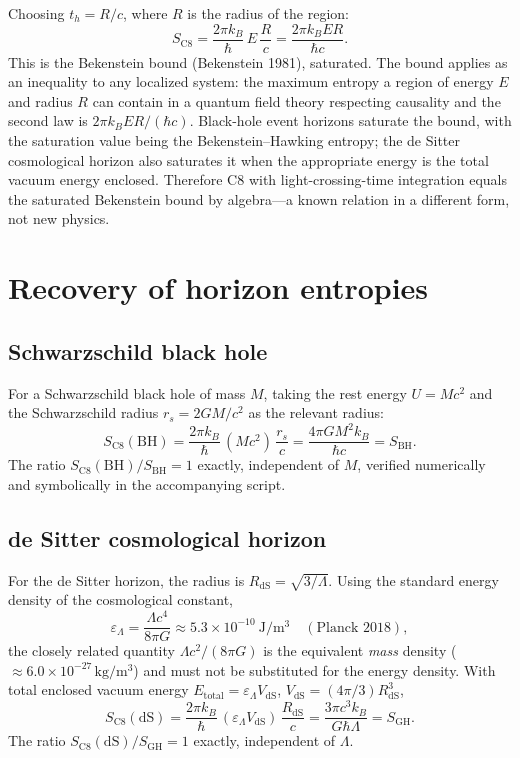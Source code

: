 \documentclass[11pt]{article}
\newcommand{\SC}{S_{\mathrm{C8}}}
\begin{document}
Choosing $t_{h} = R/c$, where $R$ is the radius of the region:
\begin{equation}
  \SC = \frac{2\pi k_{B}}{\hbar}\,E\,\frac{R}{c} = \frac{2\pi k_{B} E R}{\hbar c}.
\end{equation}
This is the Bekenstein bound (Bekenstein 1981), saturated. The bound applies as an inequality to any
localized system: the maximum entropy a region of energy $E$ and radius $R$ can contain in a quantum
field theory respecting causality and the second law is $2\pi k_{B} E R/(\hbar c)$. Black-hole event
horizons saturate the bound, with the saturation value being the Bekenstein--Hawking entropy; the de
Sitter cosmological horizon also saturates it when the appropriate energy is the total vacuum energy
enclosed. Therefore C8 with light-crossing-time integration equals the saturated Bekenstein bound by
algebra---a known relation in a different form, not new physics.

\section{Recovery of horizon entropies}
\subsection{Schwarzschild black hole}
For a Schwarzschild black hole of mass $M$, taking the rest energy $U = Mc^{2}$ and the Schwarzschild
radius $r_{s} = 2GM/c^{2}$ as the relevant radius:
\begin{equation}
  \SC(\mathrm{BH}) = \frac{2\pi k_{B}}{\hbar}\,(Mc^{2})\,\frac{r_{s}}{c}
  = \frac{4\pi G M^{2} k_{B}}{\hbar c} = S_{\mathrm{BH}}.
\end{equation}
The ratio $\SC(\mathrm{BH})/S_{\mathrm{BH}} = 1$ exactly, independent of $M$, verified numerically and
symbolically in the accompanying script.

\subsection{de Sitter cosmological horizon}
For the de Sitter horizon, the radius is $R_{\mathrm{dS}} = \sqrt{3/\Lambda}$. Using the standard
energy density of the cosmological constant,
\begin{equation}
  \varepsilon_{\Lambda} = \frac{\Lambda c^{4}}{8\pi G} \approx 5.3\times 10^{-10}\ \mathrm{J/m^{3}}
  \quad(\text{Planck 2018}),
\end{equation}
the closely related quantity $\Lambda c^{2}/(8\pi G)$ is the equivalent \emph{mass} density
($\approx 6.0\times 10^{-27}\,\mathrm{kg/m^{3}}$) and must not be substituted for the energy density.
With total enclosed vacuum energy $E_{\mathrm{total}} = \varepsilon_{\Lambda} V_{\mathrm{dS}}$,
$V_{\mathrm{dS}} = (4\pi/3)R_{\mathrm{dS}}^{3}$,
\begin{equation}
  \SC(\mathrm{dS}) = \frac{2\pi k_{B}}{\hbar}\,(\varepsilon_{\Lambda} V_{\mathrm{dS}})\,
  \frac{R_{\mathrm{dS}}}{c} = \frac{3\pi c^{3} k_{B}}{G \hbar \Lambda} = S_{\mathrm{GH}}.
\end{equation}
The ratio $\SC(\mathrm{dS})/S_{\mathrm{GH}} = 1$ exactly, independent of $\Lambda$.
\end{document}
